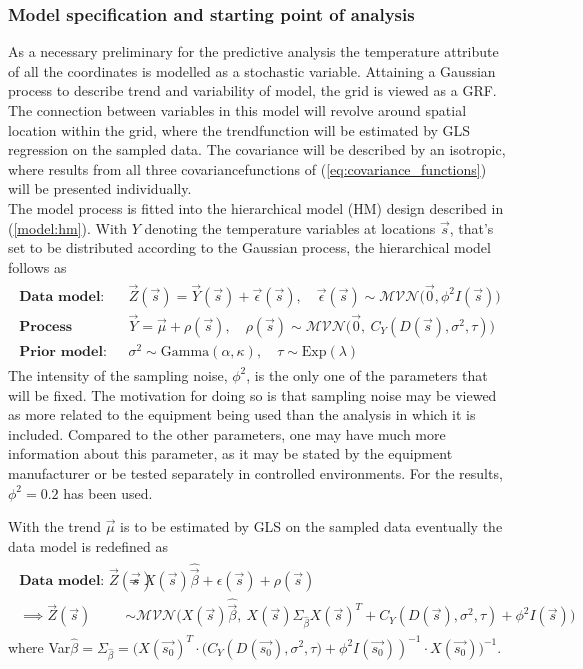 \subsubsection{Model specification and starting point of analysis} \label{subs:model}
As a necessary preliminary for the predictive analysis the temperature attribute of all the coordinates is modelled as a stochastic variable. Attaining a Gaussian process to describe trend and variability of model, the grid is viewed as a GRF. The connection between variables in this model will revolve around spatial location within the grid, where the trendfunction will be estimated by GLS regression on the sampled data. The covariance will be described by an isotropic, where results from all three covariancefunctions of (\ref{eq:covariance_functions}) will be presented individually. \\
The model process is fitted into the hierarchical model (HM) design described in (\ref{model:hm}). With $Y$ denoting the temperature variables at locations $\vec{s}$, that's set to be distributed according to the Gaussian process, the hierarchical model follows as
\begin{align*}
\begin{split}
\textbf{Data model: }& \vec{Z}(\vec{s}) = \vec{Y}(\vec{s}) + \vec{\epsilon}(\vec{s}), \quad \vec{\epsilon}(\vec{s}) \sim \mathcal{MVN} \big(\vec{0},\phi^2I(\vec{s}) \big) \\
\textbf{Process model: }& \vec{Y} = \vec{\mu} + \rho(\vec{s}), \quad \rho(\vec{s}) \sim \mathcal{MVN} \big(\vec{0}, \ C_Y(D(\vec{s}), \sigma^2, \tau ) \big) \\
\textbf{Prior model: }& \sigma^2 \sim \text{Gamma}(\alpha, \kappa), \quad \tau \sim \text{Exp}(\lambda)
\end{split}
\end{align*}
The intensity of the sampling noise, $\phi^2$, is the only one of the parameters that will be fixed. The motivation for doing so is that sampling noise may be viewed as more related to the equipment being used than the analysis in which it is included. Compared to the other parameters, one may have much more information about this parameter, as it may be stated by the equipment manufacturer or be tested separately in controlled environments. For the results, $\phi^2 = 0.2$ has been used. 

With the trend $\vec{\mu}$ is to be estimated by GLS on the sampled data eventually the data model is redefined as 
\begin{align} \label{eq:data_model}
\begin{split}
\textbf{Data model: }\vec{Z}(\vec{s}) &= X(\vec{s})\hat{\vec{\beta}} + \epsilon(\vec{s}) + \rho(\vec{s}) \\
\implies \vec{Z}(\vec{s}) &\sim \mathcal{MVN} \big( X(\vec{s})\hat{\vec{\beta}}, \ X(\vec{s}) \Sigma_{\hat{\beta}} X(\vec{s})^{T} + C_Y(D(\vec{s}), \sigma^2, \tau ) + \phi^2I(\vec{s}) \big)
\end{split}
\end{align}
where  Var${\hat{\beta}} = \Sigma_{\hat{\beta}} =  \bigg( X(\vec{s_0})^T \cdot \big( C_Y(D(\vec{s_0}), \sigma^2, \tau \big) + \phi^2I(\vec{s_0}) )^{-1} \cdot X(\vec{s_0}) \bigg)^{-1}$. \\

